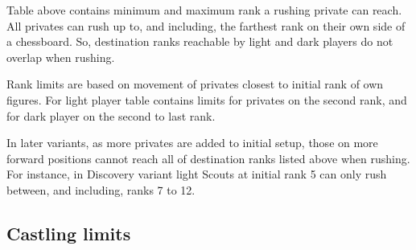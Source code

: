 Table above contains minimum and maximum rank a rushing private can reach. All
privates can rush up to, and including, the farthest rank on their own side of
a chessboard. So, destination ranks reachable by light and dark players do not
overlap when rushing.

Rank limits are based on movement of privates closest to initial rank of own
figures. For light player table contains limits for privates on the second rank,
and for dark player on the second to last rank.

In later variants, as more privates are added to initial setup, those on more
forward positions cannot reach all of destination ranks listed above when rushing.\newline
\indent
For instance, in Discovery variant light Scouts at initial rank 5 can only rush
between, and including, ranks 7 to 12.

\clearpage %

\subsection*{Castling limits}
\label{sec:Appendix/Summary/Castling limits}

